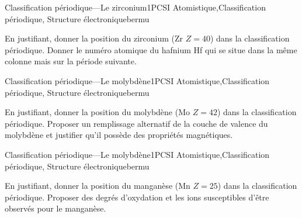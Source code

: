 
\begin{exercise}{Classification périodique\quad---\quad Le zirconium}{1}{PCSI}
{Atomistique,Classification périodique, Structure électronique}{bermu}

\begin{questions}
    \question En justifiant, donner la position du zirconium (Zr $Z=40$) dans la classification périodique.
    \question Donner le numéro atomique du hafnium Hf qui se situe dans la même colonne mais sur la période suivante.
\end{questions}
\end{exercise}

\vfill

\begin{exercise}{Classification périodique\quad---\quad Le molybdène}{1}{PCSI}
{Atomistique,Classification périodique, Structure électronique}{bermu}

\begin{questions}
    \question En justifiant, donner la position du molybdène (Mo $Z=42$) dans la classification périodique.
    \question Proposer un remplissage alternatif de la couche de valence du molybdène et justifier qu'il possède des propriétés magnétiques.
\end{questions}
\end{exercise}

\vfill

\begin{exercise}{Classification périodique\quad---\quad Le molybdène}{1}{PCSI}
{Atomistique,Classification périodique, Structure électronique}{bermu}    

\begin{questions}
    \question En justifiant, donner la position du manganèse (Mn $Z=25$) dans la classification périodique.
    \question  Proposer des degrés d'oxydation et les ions susceptibles d'être observés pour le manganèse.
\end{questions}
\end{exercise}

\vfill 
~